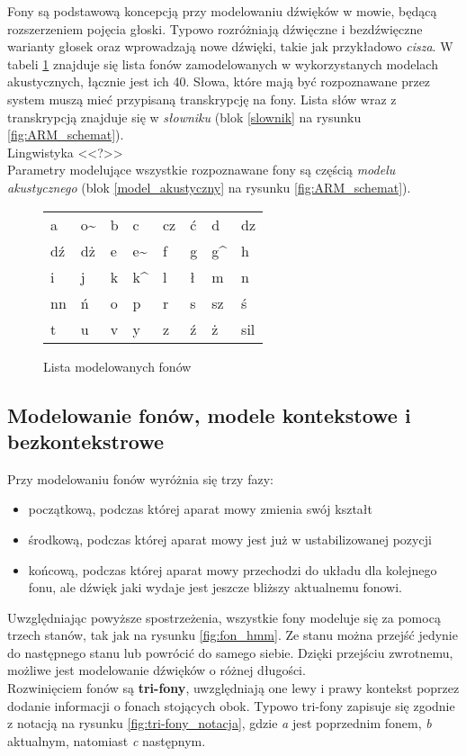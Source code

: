 \documentclass[11pt]{article}
\newcommand{\refBlock}[1]{%
	\hyperref[#1]{\ref*{#1}}%
}
\begin{document}
		Fony są podstawową koncepcją przy modelowaniu dźwięków w mowie, będącą rozszerzeniem pojęcia głoski. Typowo rozróżniają dźwięczne i bezdźwięczne warianty głosek oraz wprowadzają nowe dźwięki, takie jak przykładowo \textit{cisza}. W tabeli \ref{tab:phone_list} znajduje się lista fonów zamodelowanych w wykorzystanych modelach akustycznych, łącznie jest ich 40. Słowa, które mają być rozpoznawane przez system muszą mieć przypisaną transkrypcję na fony. Lista słów wraz z transkrypcją znajduje się w \textit{słowniku} (blok \refBlock{slownik} na rysunku \ref{fig:ARM_schemat}).
		\\
		Lingwistyka <<?>>
		\\
		Parametry modelujące wszystkie rozpoznawane fony są częścią \textit{modelu akustycznego} (blok \refBlock{model_akustyczny} na rysunku \ref{fig:ARM_schemat}). 

		\begin{figure}
			\begin{tabular}{|K{1cm}K{1cm}K{1cm}K{1cm}K{1cm}K{1cm}K{1cm}K{1cm}|}
				\hline
				a  & o\~ & b & c & cz & ć & d & dz \\ 
				dź & dż & e & e\~ & f & g & g\^ & h \\
				i & j & k & k\^ & l & ł & m & n \\
				nn & ń & o & p  & r & s & sz & ś \\
				t & u & v & y & z & ź & ż & sil \\
				\hline
			\end{tabular}
			\caption{\label{tab:phone_list}Lista modelowanych fonów}
		\end{figure}
 

	\subsection{ Modelowanie fonów, modele kontekstowe i bezkontekstrowe }
		
		Przy modelowaniu fonów wyróżnia się trzy fazy:
		\begin{itemize}
			\item początkową, podczas której aparat mowy zmienia swój kształt
			\item środkową, podczas której aparat mowy jest już w ustabilizowanej pozycji
			\item końcową, podczas której aparat mowy przechodzi do układu dla kolejnego fonu, ale dźwięk jaki wydaje jest jeszcze bliższy aktualnemu fonowi. 
		\end{itemize}
		Uwzględniając powyższe spostrzeżenia, wszystkie fony modeluje się za pomocą trzech stanów, tak jak na rysunku \ref{fig:fon_hmm}. Ze stanu można przejść jedynie do następnego stanu lub powrócić do samego siebie. Dzięki przejściu zwrotnemu, możliwe jest modelowanie dźwięków o różnej długości. 
		\\
		Rozwinięciem fonów są \textbf{tri-fony}, uwzględniają one lewy i prawy kontekst poprzez dodanie informacji o fonach stojących obok. Typowo tri-fony zapisuje się zgodnie z notacją na rysunku \ref{fig:tri-fony_notacja}, gdzie \textit{a} jest poprzednim fonem, \textit{b} aktualnym, natomiast \textit{c} następnym. 
		
\end{document}
